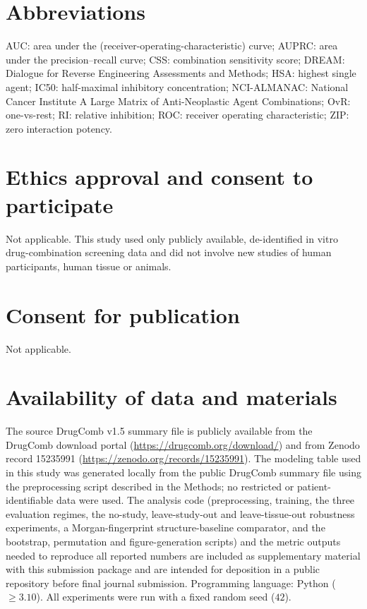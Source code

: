 \documentclass[11pt]{article}
\begin{document}
\section*{Abbreviations}
AUC: area under the (receiver-operating-characteristic) curve; AUPRC: area under the precision--recall
curve; CSS: combination sensitivity score; DREAM: Dialogue for Reverse Engineering Assessments and
Methods; HSA: highest single agent; IC50: half-maximal inhibitory concentration; NCI-ALMANAC: National
Cancer Institute A Large Matrix of Anti-Neoplastic Agent Combinations; OvR: one-vs-rest; RI: relative
inhibition; ROC: receiver operating characteristic; ZIP: zero interaction potency.

\section*{Ethics approval and consent to participate}
Not applicable. This study used only publicly available, de-identified in vitro drug-combination
screening data and did not involve new studies of human participants, human tissue or animals.

\section*{Consent for publication}
Not applicable.

\section*{Availability of data and materials}
The source DrugComb v1.5 summary file is publicly available from the DrugComb download portal
(\url{https://drugcomb.org/download/}) and from Zenodo record 15235991
(\url{https://zenodo.org/records/15235991}). The modeling table used in this study was generated
locally from the public DrugComb summary file using the preprocessing script described in the Methods;
no restricted or patient-identifiable data were used. The analysis code (preprocessing, training, the
three evaluation regimes, the no-study, leave-study-out and leave-tissue-out robustness experiments, a
Morgan-fingerprint structure-baseline comparator, and the bootstrap, permutation and figure-generation
scripts) and the metric outputs needed to reproduce all reported numbers are included as supplementary
material with this submission package and are intended for deposition in a public repository before
final journal submission. Programming language: Python ($\geq 3.10$). All experiments were run with a
fixed random seed ($42$).
\end{document}
